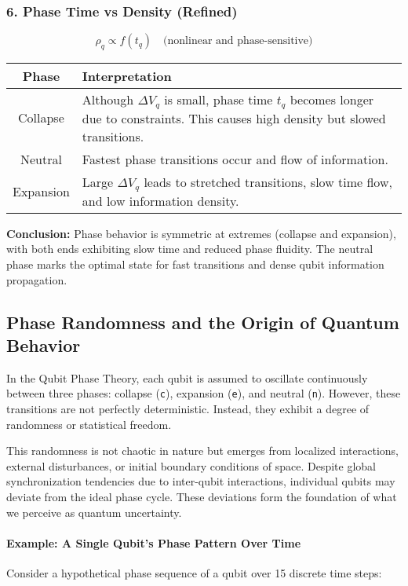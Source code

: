 \documentclass[12pt]{report} %
\begin{document}
\subsubsection*{6. Phase Time vs Density (Refined)}
\[
\rho_q \propto f(t_q)
\quad \text{(nonlinear and phase-sensitive)}
\]

\begin{center}
\begin{tabular}{|c|p{11cm}|}
\hline
\textbf{Phase} & \textbf{Interpretation} \\
\hline
Collapse & Although $\Delta V_q$ is small, phase time $t_q$ becomes longer due to constraints. This causes high density but slowed transitions. \\
\hline
Neutral & Fastest phase transitions occur and flow of information. \\
\hline
Expansion & Large $\Delta V_q$ leads to stretched transitions, slow time flow, and low information density. \\
\hline
\end{tabular}
\end{center}

\noindent \textbf{Conclusion:} 
Phase behavior is symmetric at extremes (collapse and expansion), with both ends exhibiting slow time and reduced phase fluidity. The neutral phase marks the optimal state for fast transitions and dense qubit information propagation.

\subsection{Phase Randomness and the Origin of Quantum Behavior}

In the Qubit Phase Theory, each qubit is assumed to oscillate continuously between three phases: collapse (\texttt{c}), expansion (\texttt{e}), and neutral (\texttt{n}). However, these transitions are not perfectly deterministic. Instead, they exhibit a degree of randomness or statistical freedom.

This randomness is not chaotic in nature but emerges from localized interactions, external disturbances, or initial boundary conditions of space. Despite global synchronization tendencies due to inter-qubit interactions, individual qubits may deviate from the ideal phase cycle. These deviations form the foundation of what we perceive as quantum uncertainty.

\paragraph{Example: A Single Qubit’s Phase Pattern Over Time}
Consider a hypothetical phase sequence of a qubit over 15 discrete time steps:
\end{document}
